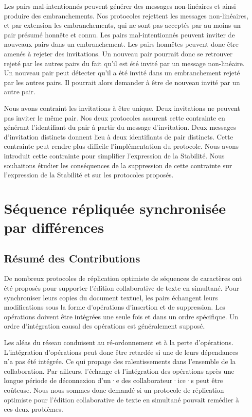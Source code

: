 Les pairs mal-intentionnés peuvent générer des messages non-linéaires et ainsi produire des embranchements.
Nos protocoles rejettent les messages non-linéaires, et par extension les embranchements, qui ne sont pas acceptés par au moins un pair présumé honnête et connu.
Les pairs mal-intentionnés peuvent inviter de nouveaux pairs dans un embranchement.
Les pairs honnêtes peuvent donc être amenés à rejeter des invitations.
Un nouveau pair pourrait donc se retrouver rejeté par les autres pairs du fait qu'il est été invité par un message non-linéaire.
Un nouveau pair peut détecter qu'il a été invité dans un embranchement rejeté par les autres pairs.
Il pourrait alors demander à être de nouveau invité par un autre pair.

Nous avons contraint les invitations à être unique.
Deux invitations ne peuvent pas inviter le même pair.
Nos deux protocoles assurent cette contrainte en générant l'identifiant du pair à partir du message d'invitation.
Deux messages d'invitation distincts donnent lieu à deux identifiants de pair distincts.
Cette contrainte peut rendre plus difficile l'implémentation du protocole.
Nous avons introduit cette contrainte pour simplifier l'expression de la Stabilité.
Nous souhaitons étudier les conséquences de la suppression de cette contrainte sur l'expression de la Stabilité et sur les protocoles proposés.


\section{Séquence répliquée synchronisée par différences}

\subsection{Résumé des Contributions}

De nombreux protocoles de réplication optimiste de séquences de caractères ont été proposés pour supporter l'édition collaborative de texte en simultané.
Pour synchroniser leurs copies du document textuel, les pairs échangent leurs modifications sous la forme d'opérations d'insertion et de suppression.
Les opérations doivent être intégrées une seule fois et dans un ordre spécifique.
Un ordre d'intégration causal des opérations est généralement supposé.

Les aléas du réseau conduisent au ré-ordonnement et à la perte d'opérations.
L'intégration d'opérations peut donc être retardée si une de leurs dépendances n'a pas été intégrée.
Ce qui propage des ralentissements dans l'ensemble de la collaboration.
Par ailleurs, l'échange et l'intégration des opérations après une longue période de déconnexion d'un·e des collaborateur·ice·s peut être coûteuse.
Nous nous sommes donc demandé si un protocole de réplication optimiste pour l'édition collaborative de texte en simultané pouvait remédier à ces deux problèmes.

